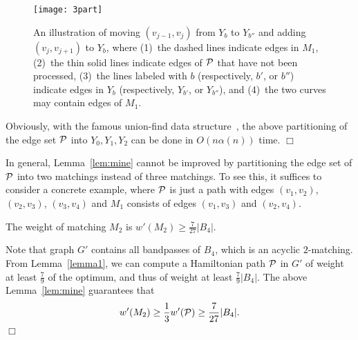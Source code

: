 \documentclass[11pt,twoside]{article}\usepackage{amssymb,latexsym,graphicx,hyperref}\usepackage{epstopdf}
\newenvironment{proof}{{\sc Proof. }}{\hfill$\Box$\vspace{0.2in}}
\begin{document}
\begin{proof}
\begin{figure}[ht]
\centerline{\texttt{[image: 3part]}}
\caption{An illustration of moving $(v_{j-1}, v_j)$ from $Y_b$ to $Y_{b''}$ and 
adding $(v_j, v_{j+1})$ to $Y_b$, where (1)~the dashed lines indicate edges in $M_1$,  
(2)~the thin solid lines indicate edges of ${\cal P}$ that have not been processed, 
(3)~the lines labeled with $b$ (respectively, $b'$, or $b''$) indicate edges in $Y_b$ 
(respectively, $Y_{b'}$, or $Y_{b''}$), and 
(4)~the two curves may contain edges of $M_1$.} 
\label{fig:3part}
\end{figure}


Obviously, with the famous union-find data structure~\cite{Tar75},
the above partitioning of the edge set ${\cal P}$ into $Y_0, Y_1, Y_2$ can be done in $O\left(n \alpha(n)\right)$ time. 
\end{proof}


In general, Lemma~\ref{lem:mine} cannot be improved by partitioning the edge set of ${\cal P}$ into two matchings instead of three matchings.
To see this, it suffices to consider a concrete example,
where ${\cal P}$ is just a path with edges $(v_1, v_2)$, $(v_2, v_3)$, $(v_3, v_4)$ and
$M_1$ consists of edges $(v_1, v_3)$ and $(v_2, v_4)$. 


\begin{lemma}
\label{lemma42}
The weight of matching $M_2$ is $w'(M_2) \ge \frac 7{27} |B_4|$.
\end{lemma}
\begin{proof}
Note that graph $G'$ contains all bandpasses of $B_4$, which is an acyclic $2$-matching.
From Lemma~\ref{lemma1}, we can compute a Hamiltonian path ${\cal P}$ in $G'$ of weight at least $\frac 79$ of the optimum,
and thus of weight at least $\frac 79 |B_4|$.
The above Lemma~\ref{lem:mine} guarantees that
\[
w'(M_2) \ge \frac 13 w'({\cal P}) \ge \frac 7{27} |B_4|.
\]
\end{proof}
\end{document}
